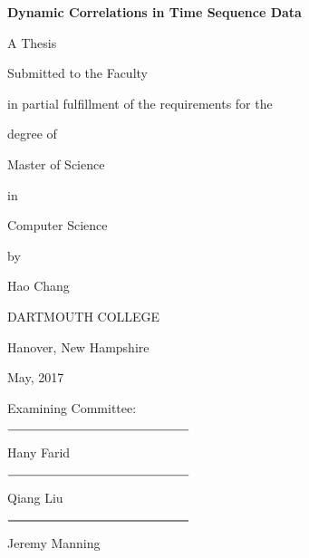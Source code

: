 \documentclass[12pt]{article}
\begin{document}
{\centering
  \textbf{Dynamic Correlations in Time Sequence Data}\par
  A Thesis\par
  Submitted to the Faculty\par
  in partial fulfillment of the requirements for the\par
  degree of\par
  Master of Science\par
  in\par
  Computer Science\par
  by\par
  Hao Chang\par
  DARTMOUTH COLLEGE\par
  Hanover, New Hampshire\par
  May, 2017\par
}
\vspace{5mm}
\setlength{\parskip}{0em}
\begin{flushright}
Examining Committee:\par
\vspace{5mm}
$\rule{5cm}{0.15mm}$\par
Hany Farid\par
\vspace{5mm}
$\rule{5cm}{0.15mm}$\par
Qiang Liu\par
\vspace{5mm}
$\rule{5cm}{0.25mm}$\par
Jeremy Manning\par
\end{flushright}
\setlength{\parskip}{1em}
\newpage


 \null\par
\newpage
{}
\end{document}
